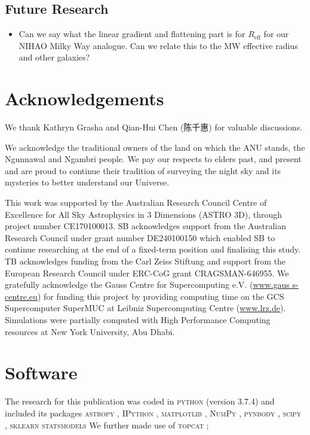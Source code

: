 \documentclass[fleqn,usenatbib]{mnras}
\begin{document}
\subsection{Future Research}

\begin{itemize}
    \item Can we say what the linear gradient and flattening part is for $R_\text{eff}$ for our NIHAO Milky Way analogue. Can we relate this to the MW effective radius and other galaxies?
\end{itemize}

\section*{Acknowledgements}

\begin{CJK}{UTF8}{gbsn}
We thank Kathryn Grasha and Qian-Hui Chen (陈千惠) for valuable discussions.
\end{CJK}

We acknowledge the traditional owners of the land on which the ANU stands, the Ngunnawal and Ngambri people. We pay our respects to elders past, and present and are proud to continue their tradition of surveying the night sky and its mysteries to better understand our Universe.

This work was supported by the Australian Research Council Centre of Excellence for All Sky Astrophysics in 3 Dimensions (ASTRO 3D), through project number CE170100013. SB acknowledges support from the Australian Research Council under grant number DE240100150 which enabled SB to continue researching at the end of a fixed-term position and finalising this study. TB acknowledges funding from the Carl Zeiss Stiftung and support from the European Research Council under ERC-CoG grant CRAGSMAN-646955. We gratefully acknowledge the Gauss Centre for Supercomputing e.V. (\url{www.gaus s-centre.eu}) for funding this project by providing computing time on the GCS Supercomputer SuperMUC at Leibniz Supercomputing Centre (\url{www.lrz.de}). Simulations were partially computed with High Performance Computing resources at New York University, Abu Dhabi.

\section*{Software}

The research for this publication was coded in \textsc{python} (version 3.7.4) and included its packages
\textsc{astropy} \citep[v. 3.2.2;][]{Robitaille2013,PriceWhelan2018},
\textsc{IPython} \citep[v. 7.8.0;][]{ipython},
\textsc{matplotlib} \citep[v. 3.1.3;][]{matplotlib},
\textsc{NumPy} \citep[v. 1.17.2;][]{numpy},
\textsc{pynbody} \citep[v. 1.1.0;][]{pynbody},
\textsc{scipy} \citep[v. 1.3.1;][]{Scipy},
\textsc{sklearn} \citep[v. 1.5.1][]{scikit-learn}
\textsc{statsmodels} \citep[v. 0.14.2][]{statsmodels}
We further made use of \textsc{topcat} \citep[version 4.7;][]{Taylor2005};
\end{document}
